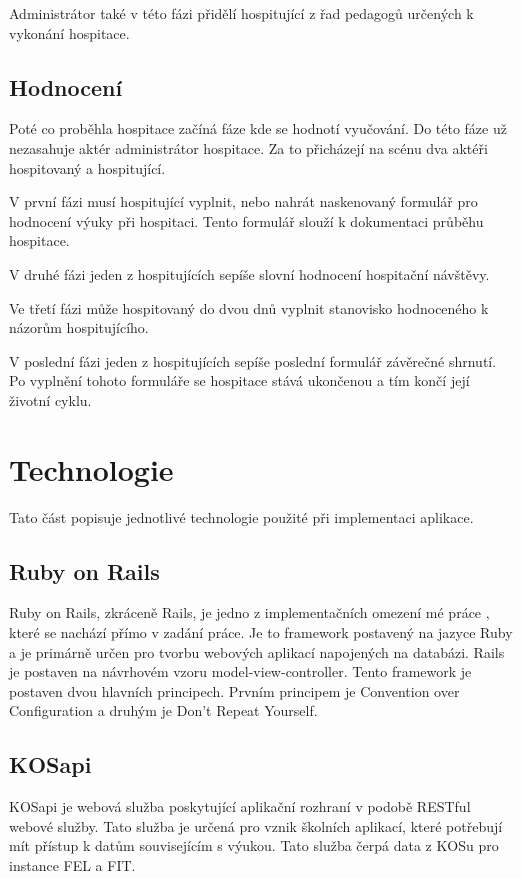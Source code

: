 Administrátor také v této fázi přidělí hospitující z řad pedagogů určených k vykonání hospitace.  
 
\subsection{Hodnocení}
Poté co proběhla hospitace začíná fáze kde se hodnotí vyučování. Do této fáze už nezasahuje aktér administrátor hospitace. Za to přicházejí na scénu dva aktéři hospitovaný a hospitující.

V první fázi musí hospitující vyplnit, nebo nahrát naskenovaný formulář pro hodnocení výuky při hospitaci. Tento formulář slouží k dokumentaci průběhu hospitace.

V druhé fázi jeden z hospitujících sepíše slovní hodnocení hospitační návštěvy.

Ve třetí fázi může hospitovaný do dvou dnů vyplnit stanovisko hodnoceného k názorům hospitujícího.  

V poslední fázi jeden z hospitujících sepíše poslední formulář závěrečné shrnutí. Po vyplnění tohoto formuláře se hospitace stává ukončenou a tím končí její životní cyklu.
 
\section{Technologie}
Tato část popisuje jednotlivé technologie použité při implementaci aplikace.

\subsection{Ruby on Rails}
Ruby on Rails, zkráceně Rails, je jedno z implementačních omezení mé práce , které se nachází přímo v zadání práce. Je to framework postavený na jazyce Ruby a je primárně určen pro tvorbu webových aplikací napojených na databázi. Rails je postaven na návrhovém vzoru model-view-controller. Tento framework je postaven dvou hlavních principech. Prvním principem je Convention over Configuration a druhým je Don’t Repeat Yourself.

\subsection{KOSapi}
KOSapi je webová služba poskytující aplikační rozhraní v podobě RESTful webové služby. Tato služba je určená pro vznik školních aplikací, které potřebují mít přístup k datům souvisejícím s výukou. Tato služba čerpá data z KOSu pro instance FEL a FIT.


